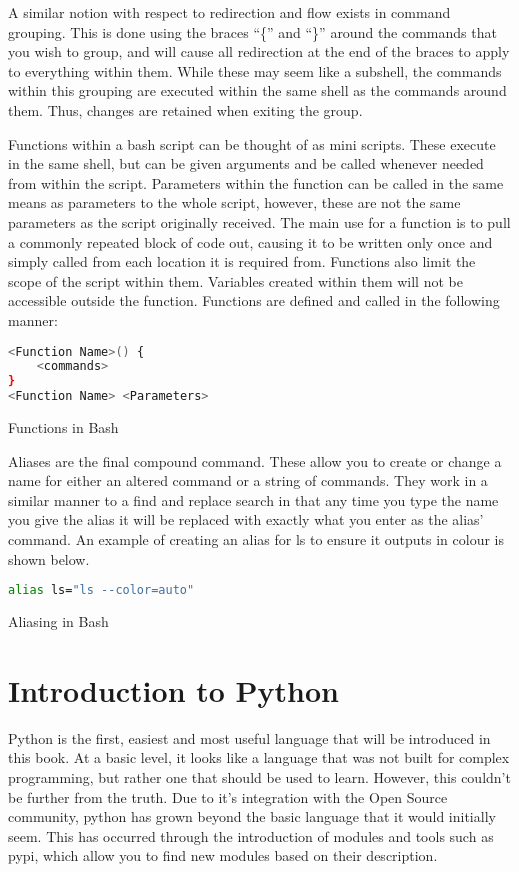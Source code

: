 			A similar notion with respect to redirection and flow exists in command grouping. 
			This is done using the braces ``\{'' and ``\}'' around the commands that you wish to group, and will cause all redirection at the end of the braces to apply to everything within them. 
			While these may seem like a subshell, the commands within this grouping are executed within the same shell as the commands around them. 
			Thus, changes are retained when exiting the group. 

			Functions within a bash script can be thought of as mini scripts. 
			These execute in the same shell, but can be given arguments and be called whenever needed from within the script. 
			Parameters within the function can be called in the same means as parameters to the whole script, however, these are not the same parameters as the script originally received. 
			The main use for a function is to pull a commonly repeated block of code out, causing it to be written only once and simply called from each location it is required from. 
			Functions also limit the scope of the script within them. 
			Variables created within them will not be accessible outside the function. 
			Functions are defined and called in the following manner:
			\begin{code}
			\begin{lstlisting}[language=bash]
<Function Name>() {
	<commands>
}
<Function Name> <Parameters>
			\end{lstlisting}
			\label{code:bashFunctions}
			\caption{Functions in Bash}
			\end{code}

		
			Aliases are the final compound command. 
			These allow you to create or change a name for either an altered command or a string of commands. 
			They work in a similar manner to a find and replace search in that any time you type the name you give the alias it will be replaced with exactly what you enter as the alias' command. 
			An example of creating an alias for ls to ensure it outputs in colour is shown below. 
			\begin{code}
			\begin{lstlisting}[language=bash]
alias ls="ls --color=auto"
			\end{lstlisting}
			\label{code:bashAlias}
			\caption{Aliasing in Bash}
			\end{code}
	\section{Introduction to Python}
		Python is the first, easiest and most useful language that will be introduced in this book.\cite{PythonBoringStuff} 
		At a basic level, it looks like a language that was not built for complex programming, but rather one that should be used to learn. 
		However, this couldn't be further from the truth. 
		Due to it's integration with the Open Source community, python has grown beyond the basic language that it would initially seem. 
		This has occurred through the introduction of modules and tools such as pypi, which allow you to find new modules based on their description. 
